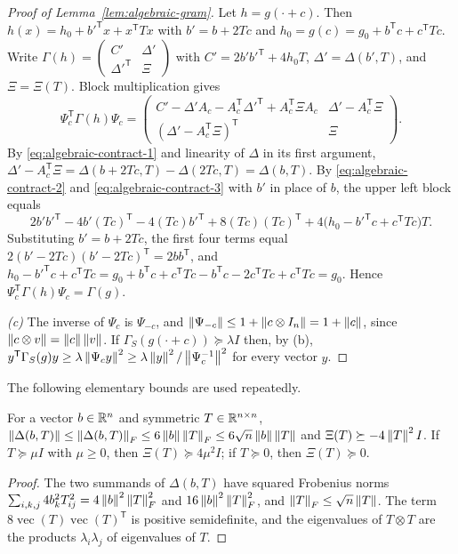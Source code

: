 \begin{proof}[Proof of Lemma~\ref{lem:algebraic-gram}]
Let $h=g(\cdot+c)$. Then $h(x)=h_0+b'^{\mathsf T}x+x^{\mathsf T}Tx$ with
$b'=b+2Tc$ and $h_0=g(c)=g_0+b^{\mathsf T}c+c^{\mathsf T}Tc$. Write
$\Gamma(h)=\left(\begin{smallmatrix}C'&\Delta'\\\Delta'^{\mathsf T}&\Xi
\end{smallmatrix}\right)$ with $C'=2b'b'^{\mathsf T}+4h_0T$,
$\Delta'=\Delta(b',T)$, and $\Xi=\Xi(T)$. Block multiplication gives
\[
 \Psi_c^{\mathsf T}\Gamma(h)\Psi_c=
 \begin{pmatrix}
 C'-\Delta'A_c-A_c^{\mathsf T}\Delta'^{\mathsf T}+A_c^{\mathsf T}\Xi A_c
   &\Delta'-A_c^{\mathsf T}\Xi\\
 (\Delta'-A_c^{\mathsf T}\Xi)^{\mathsf T}&\Xi
 \end{pmatrix}.
\]
By \eqref{eq:algebraic-contract-1} and linearity of $\Delta$ in its first
argument, $\Delta'-A_c^{\mathsf T}\Xi=\Delta(b+2Tc,T)-\Delta(2Tc,T)=\Delta(b,T)$.
By \eqref{eq:algebraic-contract-2} and \eqref{eq:algebraic-contract-3} with
$b'$ in place of $b$, the upper left block equals
\[
 2b'b'^{\mathsf T}-4b'(Tc)^{\mathsf T}-4(Tc)b'^{\mathsf T}+8(Tc)(Tc)^{\mathsf T}
 +4\bigl(h_0-b'^{\mathsf T}c+c^{\mathsf T}Tc\bigr)T .
\]
Substituting $b'=b+2Tc$, the first four terms equal $2(b'-2Tc)(b'-2Tc)^{\mathsf
T}=2bb^{\mathsf T}$, and
$h_0-b'^{\mathsf T}c+c^{\mathsf T}Tc
=g_0+b^{\mathsf T}c+c^{\mathsf T}Tc-b^{\mathsf T}c-2c^{\mathsf T}Tc
 +c^{\mathsf T}Tc=g_0$. Hence $\Psi_c^{\mathsf T}\Gamma(h)\Psi_c=\Gamma(g)$.

\emph{(c)} The inverse of $\Psi_c$ is $\Psi_{-c}$, and
$\left\lVert\Psi_{-c}\right\rVert\le1+\left\lVert c\otimes I_n\right\rVert=1+\left\lVert c\right\rVert$, since
$\left\lVert c\otimes v\right\rVert=\left\lVert c\right\rVert\left\lVert v\right\rVert$. If $\Gamma_S(g(\cdot+c))\succeq\lambda I$
then, by (b), $y^{\mathsf T}\Gamma_S(g)y\ge\lambda\left\lVert\Psi_cy\right\rVert^2
\ge\lambda\left\lVert y\right\rVert^2/\left\lVert\Psi_c^{-1}\right\rVert^2$ for every vector $y$.
\end{proof}

The following elementary bounds are used repeatedly.

\begin{lemma}
\label{lem:algebraic-block-bounds}
For a vector $b\in\mathbb R^n$ and symmetric $T\in\mathbb R^{n\times n}$,
$\left\lVert\Delta(b,T)\right\rVert\le\left\lVert\Delta(b,T)\right\rVert_F\le6\left\lVert b\right\rVert\left\lVert T\right\rVert_F
\le6\sqrt n\left\lVert b\right\rVert\left\lVert T\right\rVert$ and $\Xi(T)\succeq-4\left\lVert T\right\rVert^2I$. If
$T\succeq\mu I$ with $\mu\ge0$, then $\Xi(T)\succeq4\mu^2I$; if $T\succeq0$, then
$\Xi(T)\succeq0$.
\end{lemma}

\begin{proof}
The two summands of $\Delta(b,T)$ have squared Frobenius norms
$\sum_{i,k,j}4b_k^2T_{ij}^2=4\left\lVert b\right\rVert^2\left\lVert T\right\rVert_F^2$ and
$16\left\lVert b\right\rVert^2\left\lVert T\right\rVert_F^2$, and $\left\lVert T\right\rVert_F\le\sqrt n\left\lVert T\right\rVert$. The term
$8\operatorname{vec}(T)\operatorname{vec}(T)^{\mathsf T}$ is positive
semidefinite, and the eigenvalues of $T\otimes T$ are the products
$\lambda_i\lambda_j$ of eigenvalues of $T$.
\end{proof}

